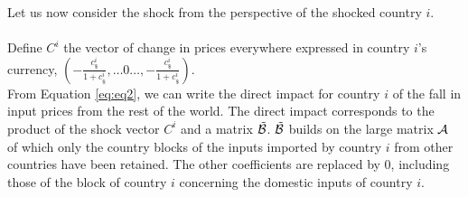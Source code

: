 \documentclass[11pt,a4paper]{article}
\begin{document}
Let us now consider the shock from the perspective of the shocked country $i$.\\
\\%
%
%
%
Define $C^i$ the vector of change in prices everywhere expressed in country $i$'s currency, 
$\left(-\frac{c_\$^i}{1+c_\$^i},\ldots0\ldots,-\frac{c_\$^i}{1+c_\$^i} \right)$. \\

From Equation \ref{eq:eq2}, we can write the direct impact for country $i$ of the fall in input prices from the rest of the world. 
The direct impact corresponds to the product of the shock vector $C^i$ and a matrix ${\tilde{{\cal B}}}$. ${\tilde{{\cal B}}}$ builds on the large matrix ${\cal A}$ of which only the country blocks of the inputs imported by country $i$ from other countries have been retained. 
The other coefficients are replaced by 0, including those of the block of country $i$ concerning the domestic inputs of country $i$. \\
\end{document}
